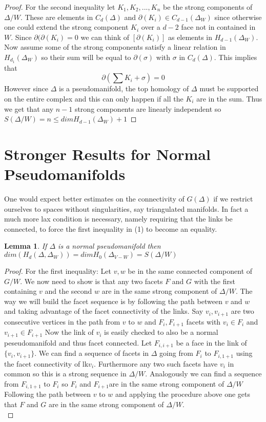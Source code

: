 \documentclass[a4paper]{article}
\newtheorem{lemma}[theorem]{Lemma}
\begin{document}
{\begin{proof}
For the second inequality let $K_1,K_2,...,K_n$ be the strong components of $\Delta/W$. These are elements in $C_d(\Delta)$ and $\partial(K_i) \in C_{d-1}(\Delta_W)$ since otherwise one could extend the strong component $K_i$ over a $d-2$ face not in contained in $W$. Since $\partial(\partial(K_i)=0$ we can think of $[\partial(K_i)]$ as elements in $H_{d-1}(\Delta_W)$. Now assume some of the strong components satisfy a linear relation in $H_{d_1}(\Delta_W)$ so their sum will be equal to $\partial(\sigma)$ with $\sigma$ in $C_d(\Delta)$. This implies that 
  $$\partial(\sum K_i+\sigma) =0$$ However since $\Delta$ is a pseudomanifold, the top homology of $\Delta$ must be supported on the entire complex and this can only happen if all the $K_i$ are in the sum. Thus we get that any $n-1$ strong components are linearly independent so $S(\Delta/W)= n\leq dim H_{d-1}(\Delta_W)+1  $
\end{proof}

\section{Stronger Results for Normal Pseudomanifolds}


One would expect better estimates on the connectivity of $G(\Delta)$ if we restrict ourselves to spaces without singularities, say triangulated manifolds. In fact a much more lax condition is necessary, namely requiring that the links be connected, to force the first inequality in (1) to become an equality. \\

\begin{lemma} 
If $\Delta$ is a normal pseudomanifold then $dim(H_d(\Delta,\Delta_W)) = dim H_0(\Delta_{V-W}) = S(\Delta/W)$ \\
\end{lemma}

\begin{proof}
For the first inequality: Let $v,w$ be in the same connected component of $G/W$. We now need to show is that any two facets $F$ and $G$ with the first containing $v$ and the second $w$ are in the same strong component of $\Delta/W$. The way we will build the facet sequence is by following the path between $v$ and $w$ and taking advantage of the facet connectivity of the links. Say $v_{i}, v_{i+1}$ are two consecutive vertices in the path from $v$ to $w$ and $F_i, F_{i+1}$ facets with $v_i\in F_i$ and $v_{i+1} \in F_{i+1}$ Now the link of $v_i$ is easily checked to also be a normal peseudomanifold and thus facet connected. Let $F_{i,i+1}$ be a face in the link of $\{v_i,v_{i+1}\}$. We can find a sequence of facets in $\Delta$   going from $F_i$ to $F_{i,1+1}$ using the facet connectivity of lk$v_i$. Furthermore any two such facets have $v_i$ in common so this is a strong sequence in $\Delta/W$. Analogously we can find a sequence from $F_{i,1+1}$ to $F_{i}$ so $F_i$ and $F_{i+1}$are in the same strong component of $\Delta/W$ Following the path between $v$ to $w$ and applying the procedure above one gets that $F$ and $G$ are in the same strong component of $\Delta/W$.  \\


\end{proof}}
\end{document}
